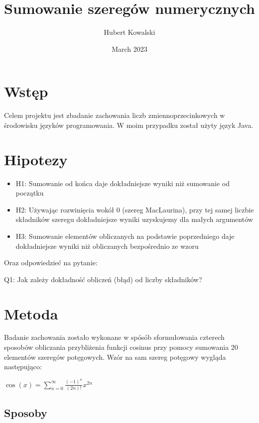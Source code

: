 \documentclass{article}
\title{Sumowanie szeregów numerycznych}
\author{Hubert Kowalski}
\date{March 2023}
\begin{document}
\maketitle

\section{Wstęp}

Celem projektu jest zbadanie zachowania liczb zmiennoprzecinkowych w środowisku języków programowania. W moim przypadku został użyty język Java.

\section{Hipotezy}


\begin{itemize}
\item H1: Sumowanie od końca daje dokładniejsze wyniki niż sumowanie od początku
\item H2: Używając rozwinięcia wokół 0 (szereg MacLaurina), przy tej samej liczbie składników szeregu dokładniejsze wyniki uzyskujemy dla małych argumentów
\item H3: Sumowanie elementów obliczanych na podstawie poprzedniego daje dokładniejsze wyniki niż obliczanych bezpośrednio ze wzoru
\end{itemize}

Oraz odpowiedzieć na pytanie:

Q1: Jak zależy dokładność obliczeń (błąd) od liczby składników?

\section{Metoda}

Badanie zachowania zostało wykonane w spósób sformułowania czterech sposobów obliczania przybliżenia funkcji cosinus przy pomocy sumowania 20 elementów szeregów potęgowych. 
Wzór na sam szereg potęgowy wygląda następująco: 

\begin{center}
\begin{math}
\cos(x) = \sum_{n=0}^{\infty} \frac{(-1)^n}{(2n)!} x^{2n}
\end{math}
\end{center}

\clearpage

\subsection{Sposoby}
\end{document}
